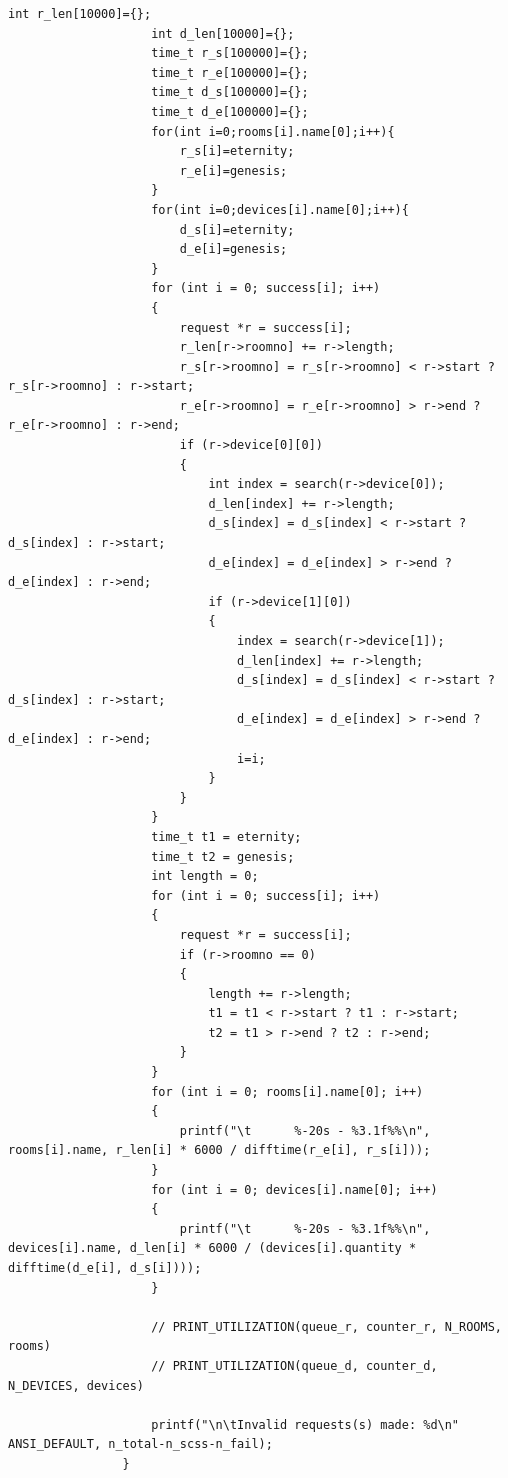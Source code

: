 \documentclass{article}
\begin{document}
\begin{Verbatim}[gobble=8]
                    int r_len[10000]={};
                    int d_len[10000]={};
                    time_t r_s[100000]={};
                    time_t r_e[100000]={};
                    time_t d_s[100000]={};
                    time_t d_e[100000]={};
                    for(int i=0;rooms[i].name[0];i++){
                        r_s[i]=eternity;
                        r_e[i]=genesis;
                    }
                    for(int i=0;devices[i].name[0];i++){
                        d_s[i]=eternity;
                        d_e[i]=genesis;
                    }
                    for (int i = 0; success[i]; i++)
                    {
                        request *r = success[i];
                        r_len[r->roomno] += r->length;
                        r_s[r->roomno] = r_s[r->roomno] < r->start ? r_s[r->roomno] : r->start;
                        r_e[r->roomno] = r_e[r->roomno] > r->end ? r_e[r->roomno] : r->end;
                        if (r->device[0][0])
                        {
                            int index = search(r->device[0]);
                            d_len[index] += r->length;
                            d_s[index] = d_s[index] < r->start ? d_s[index] : r->start;
                            d_e[index] = d_e[index] > r->end ? d_e[index] : r->end;
                            if (r->device[1][0])
                            {
                                index = search(r->device[1]);
                                d_len[index] += r->length;
                                d_s[index] = d_s[index] < r->start ? d_s[index] : r->start;
                                d_e[index] = d_e[index] > r->end ? d_e[index] : r->end;
                                i=i;
                            }
                        }
                    }
                    time_t t1 = eternity;
                    time_t t2 = genesis;
                    int length = 0;
                    for (int i = 0; success[i]; i++)
                    {
                        request *r = success[i];
                        if (r->roomno == 0)
                        {
                            length += r->length;
                            t1 = t1 < r->start ? t1 : r->start;
                            t2 = t1 > r->end ? t2 : r->end;
                        }
                    }
                    for (int i = 0; rooms[i].name[0]; i++)
                    {
                        printf("\t      %-20s - %3.1f%%\n", rooms[i].name, r_len[i] * 6000 / difftime(r_e[i], r_s[i]));
                    }
                    for (int i = 0; devices[i].name[0]; i++)
                    {
                        printf("\t      %-20s - %3.1f%%\n", devices[i].name, d_len[i] * 6000 / (devices[i].quantity * difftime(d_e[i], d_s[i])));
                    }
                
                    // PRINT_UTILIZATION(queue_r, counter_r, N_ROOMS, rooms)
                    // PRINT_UTILIZATION(queue_d, counter_d, N_DEVICES, devices)
                
                    printf("\n\tInvalid requests(s) made: %d\n" ANSI_DEFAULT, n_total-n_scss-n_fail);
                }
            \end{Verbatim}
\end{document}

